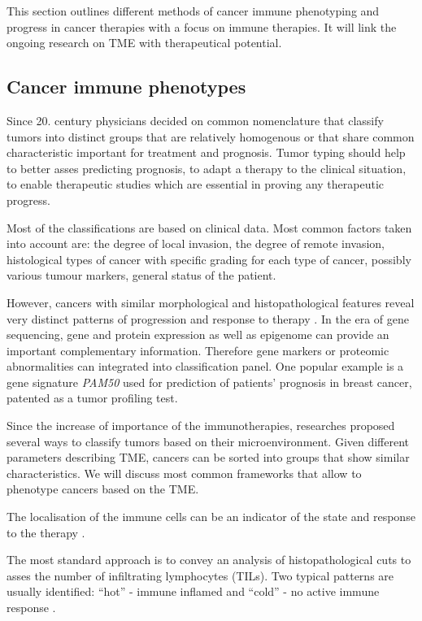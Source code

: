 \documentclass[12pt,]{book}
\theoremstyle{definition}
\theoremstyle{definition}
\theoremstyle{definition}
\theoremstyle{remark}
\begin{document}
This section outlines different methods of cancer immune phenotyping and
progress in cancer therapies with a focus on immune therapies. It will
link the ongoing research on TME with therapeutical potential.

\hypertarget{cancer-immune-phenotypes}{%
\subsection{Cancer immune phenotypes}\label{cancer-immune-phenotypes}}

Since 20. century physicians decided on common nomenclature that
classify tumors into distinct groups that are relatively homogenous or
that share common characteristic important for treatment and prognosis.
Tumor typing should help to better asses predicting prognosis, to adapt
a therapy to the clinical situation, to enable therapeutic studies which
are essential in proving any therapeutic progress.

Most of the classifications are based on clinical data. Most common
factors taken into account are: the degree of local invasion, the degree
of remote invasion, histological types of cancer with specific grading
for each type of cancer, possibly various tumour markers, general status
of the patient.

However, cancers with similar morphological and histopathological
features reveal very distinct patterns of progression and response to
therapy \citep{Galon2014}. In the era of gene sequencing, gene and
protein expression as well as epigenome can provide an important
complementary information. Therefore gene markers or proteomic
abnormalities can integrated into classification panel. One popular
example is a gene signature \emph{PAM50} \citep{Parker2009} used for
prediction of patients' prognosis in breast cancer, patented as a tumor
profiling test.

Since the increase of importance of the immunotherapies, researches
proposed several ways to classify tumors based on their
microenvironment. Given different parameters describing TME, cancers can
be sorted into groups that show similar characteristics. We will discuss
most common frameworks that allow to phenotype cancers based on the TME.

The localisation of the immune cells can be an indicator of the state
and response to the therapy \citep{Bindea2013}.

The most standard approach is to convey an analysis of histopathological
cuts to asses the number of infiltrating lymphocytes (TILs). Two typical
patterns are usually identified: ``hot'' - immune inflamed and ``cold''
- no active immune response \citep{Berghoff2018}.
\end{document}

